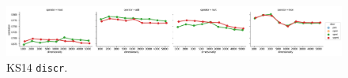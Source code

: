 \begin{figure}[t]
  \centering

  \includegraphics[width=1.1\textwidth]{supplement/figures/ks14-interaction-discr}

  \caption{KS14 \texttt{discr}.}
  \label{fig:ks14-discr}
\end{figure}
